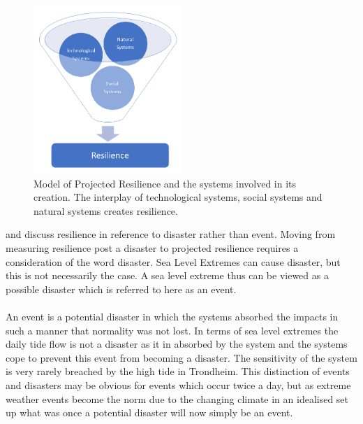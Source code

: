\begin{figure}[h!]
    \centering
    \includegraphics[width=0.5\textwidth]{fig_theory/resilience model .png}
    \caption{Model of Projected Resilience and the systems involved in its creation. The interplay of technological systems, social systems and natural systems creates resilience. }
    \label{fig:projected_resilience}
\end{figure}

\cite{cutter_place-based_2008} and \cite{cutter_community_2020} discuss resilience in reference to disaster rather than event. Moving from measuring resilience post a disaster to projected resilience requires a consideration of the word disaster. Sea Level Extremes can cause disaster, but this is not necessarily the case. A sea level extreme thus can be viewed as a possible disaster which is referred to here as an event. 
\paragraph{}
An event is a potential disaster in which the systems absorbed the impacts in such a manner that normality was not lost. In terms of sea level extremes the daily tide flow is not a disaster as it in absorbed by the system and the systems cope to prevent this event from becoming a disaster. The sensitivity of the system is very rarely breached by the high tide in Trondheim. This distinction of events and disasters may be obvious for events which occur twice a day, but as extreme weather events become the norm due to the changing climate in an idealised set up what was once a potential disaster will now simply be an event. 
\paragraph{}

